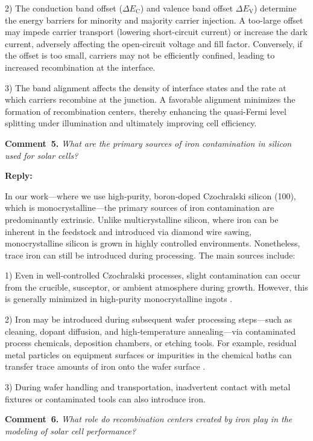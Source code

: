 \documentclass[a4paper,fleqn]{cas-sc}
\begin{document}
2) The conduction band offset ($\Delta E_\mathrm{C}$) and valence band offset $\Delta E_\mathrm{V}$) determine the energy barriers for minority and majority carrier injection. A too-large offset may impede carrier transport (lowering short-circuit current) or increase the dark current, adversely affecting the open-circuit voltage and fill factor. Conversely, if the offset is too small, carriers may not be efficiently confined, leading to increased recombination at the interface.

3) The band alignment affects the density of interface states and the rate at which carriers recombine at the junction. A favorable alignment minimizes the formation of recombination centers, thereby enhancing the quasi-Fermi level splitting under illumination and ultimately improving cell efficiency.


\noindent
\textcolor[rgb]{0.00,0.50,1.00}{\textbf{Comment~5.}}
\emph{What are the primary sources of iron contamination in silicon used for solar cells?}

\noindent
\textcolor[rgb]{0.51,0.00,0.00}{\textbf{Reply:}}

In our work—where we use high‑purity, boron‑doped Czochralski silicon (100), which is monocrystalline—the primary sources of iron contamination are predominantly extrinsic. Unlike multicrystalline silicon, where iron can be inherent in the feedstock and introduced via diamond wire sawing, monocrystalline silicon is grown in highly controlled environments. Nonetheless, trace iron can still be introduced during processing. The main sources include:

1) Even in well‐controlled Czochralski processes, slight contamination can occur from the crucible, susceptor, or ambient atmosphere during growth. However, this is generally minimized in high‑purity monocrystalline ingots \cite{Goncalo2017}. 

2) Iron may be introduced during subsequent wafer processing steps—such as cleaning, dopant diffusion, and high‑temperature annealing—via contaminated process chemicals, deposition chambers, or etching tools. For example, residual metal particles on equipment surfaces or impurities in the chemical baths can transfer trace amounts of iron onto the wafer surface \cite{abbott2014}.

3) During wafer handling and transportation, inadvertent contact with metal fixtures or contaminated tools can also introduce iron.


\noindent
\textcolor[rgb]{0.00,0.50,1.00}{\textbf{Comment~6.}}
\emph{What role do recombination centers created by iron play in the modeling of solar cell performance?}
\end{document}

